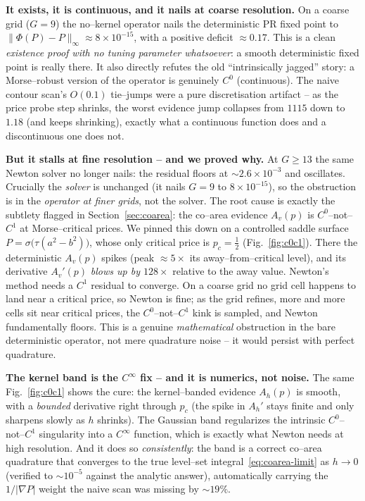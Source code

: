 \documentclass[11pt]{article}
\newcommand{\grad}{\nabla}
\begin{document}
\textbf{It exists, it is continuous, and it nails at coarse resolution.}
On a coarse grid ($G=9$) the no--kernel operator nails the deterministic PR
fixed point to $\|\Phi(P)-P\|_\infty\approx 8\times10^{-15}$, with a
positive deficit $\approx0.17$. This is a clean \emph{existence proof with no
tuning parameter whatsoever}: a smooth deterministic fixed point is really
there. It also directly refutes the old ``intrinsically jagged'' story: a
Morse--robust version of the operator is genuinely $C^0$ (continuous). The
naive contour scan's $O(0.1)$ tie--jumps were a pure discretisation artifact
-- as the price probe step shrinks, the worst evidence jump collapses from
$1115$ down to $1.18$ (and keeps shrinking), exactly what a continuous
function does and a discontinuous one does not.

\textbf{But it stalls at fine resolution -- and we proved why.} At $G\ge13$
the same Newton solver no longer nails: the residual floors at
$\sim2.6\times10^{-3}$ and oscillates. Crucially the \emph{solver} is
unchanged (it nails $G=9$ to $8\times10^{-15}$), so the obstruction is in the
\emph{operator at finer grids}, not the solver. The root cause is exactly the
subtlety flagged in Section~\ref{sec:coarea}: the co--area evidence $A_v(p)$
is $C^0$--not--$C^1$ at Morse--critical prices. We pinned this down on a
controlled saddle surface $P=\sigma\big(\tau(a^2-b^2)\big)$, whose only
critical price is $p_c=\tfrac12$ (Fig.~\ref{fig:c0c1}). There the
deterministic $A_v(p)$ spikes (peak $\approx5\times$ its away--from--critical
level), and its derivative $A_v'(p)$ \emph{blows up by $128\times$} relative
to the away value. Newton's method needs a $C^1$ residual to converge. On a
coarse grid no grid cell happens to land near a critical price, so Newton is
fine; as the grid refines, more and more cells sit near critical prices, the
$C^0$--not--$C^1$ kink is sampled, and Newton fundamentally floors. This is a
genuine \emph{mathematical} obstruction in the bare deterministic operator,
not mere quadrature noise -- it would persist with perfect quadrature.

\textbf{The kernel band is the $C^\infty$ fix -- and it is numerics, not
noise.} The same Fig.~\ref{fig:c0c1} shows the cure: the kernel--banded
evidence $A_h(p)$ is smooth, with a \emph{bounded} derivative right through
$p_c$ (the spike in $A_h'$ stays finite and only sharpens slowly as $h$
shrinks). The Gaussian band regularizes the intrinsic $C^0$--not--$C^1$
singularity into a $C^\infty$ function, which is exactly what Newton needs at
high resolution. And it does so \emph{consistently}: the band is a correct
co--area quadrature that converges to the true level--set
integral~\eqref{eq:coarea-limit} as $h\to0$ (verified to $\sim10^{-5}$
against the analytic answer), automatically carrying the $1/|\grad P|$ weight
the naive scan was missing by $\sim19\%$.
\end{document}
